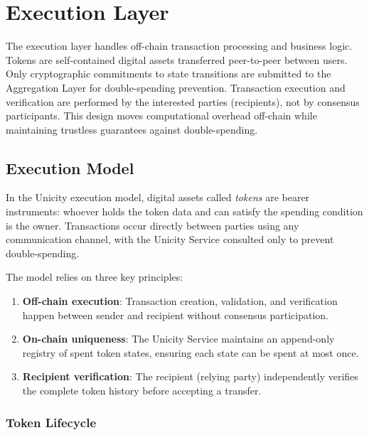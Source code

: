 \chapter{Execution Layer}\label{ch:execution-layer}

The execution layer handles off-chain transaction processing and business logic. Tokens are self-contained digital assets transferred peer-to-peer between users. Only cryptographic commitments to state transitions are submitted to the Aggregation Layer for double-spending prevention. Transaction execution and verification are performed by the interested parties (recipients), not by consensus participants. This design moves computational overhead off-chain while maintaining trustless guarantees against double-spending.

\section{Execution Model}

In the Unicity execution model, digital assets called \emph{tokens} are bearer instruments: whoever holds the token data and can satisfy the spending condition is the owner. Transactions occur directly between parties using any communication channel, with the Unicity Service consulted only to prevent double-spending.

The model relies on three key principles:
\begin{enumerate}
	\item \textbf{Off-chain execution}: Transaction creation, validation, and verification happen between sender and recipient without consensus participation.
	\item \textbf{On-chain uniqueness}: The Unicity Service maintains an append-only registry of spent token states, ensuring each state can be spent at most once.
	\item \textbf{Recipient verification}: The recipient (relying party) independently verifies the complete token history before accepting a transfer.
\end{enumerate}

\subsection{Token Lifecycle}\label{sec:token-lifecycle}

